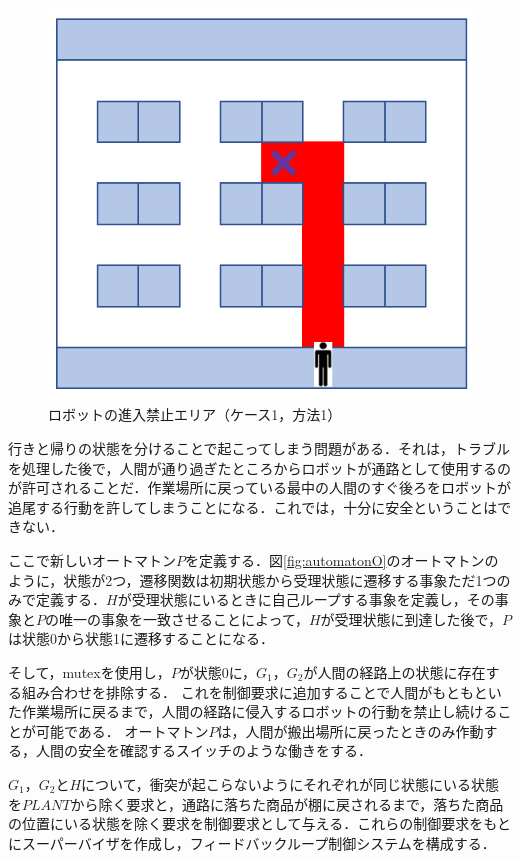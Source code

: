 \begin{figure}[!t]
    \centering
    \includegraphics[scale=0.3]{figures/5_human_area.png}
    \caption{ロボットの進入禁止エリア（ケース1，方法1）}
    \label{fig:human_area}
\end{figure}

行きと帰りの状態を分けることで起こってしまう問題がある．それは，トラブルを処理した後で，人間が通り過ぎたところからロボットが通路として使用するのが許可されることだ．作業場所に戻っている最中の人間のすぐ後ろをロボットが追尾する行動を許してしまうことになる．これでは，十分に安全ということはできない．

ここで新しいオートマトン$P$を定義する．図\ref{fig:automatonO}のオートマトンのように，状態が2つ，遷移関数は初期状態から受理状態に遷移する事象ただ1つのみで定義する．$H$が受理状態にいるときに自己ループする事象を定義し，その事象と$P$の唯一の事象を一致させることによって，$H$が受理状態に到達した後で，$P$は状態0から状態1に遷移することになる．

そして，mutexを使用し，$P$が状態0に，$G_1，G_2$が人間の経路上の状態に存在する組み合わせを排除する．
これを制御要求に追加することで人間がもともといた作業場所に戻るまで，人間の経路に侵入するロボットの行動を禁止し続けることが可能である．
オートマトン$P$は，人間が搬出場所に戻ったときのみ作動する，人間の安全を確認するスイッチのような働きをする．

$G_1，G_2$と$H$について，衝突が起こらないようにそれぞれが同じ状態にいる状態を$PLANT$から除く要求と，通路に落ちた商品が棚に戻されるまで，落ちた商品の位置にいる状態を除く要求を制御要求として与える．これらの制御要求をもとにスーパーバイザを作成し，フィードバックループ制御システムを構成する．

